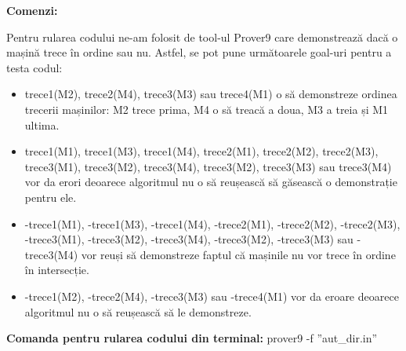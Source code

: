     \inputminted[linenos]{C}{cod/aut_dir.in}



    
\textbf{Comenzi:}

Pentru rularea codului ne-am folosit de tool-ul Prover9 care demonstrează dacă o mașină trece în ordine sau nu. Astfel, se pot pune următoarele goal-uri pentru a testa codul:


 \begin{itemize}
    \setlength\itemsep{0em}
    \item trece1(M2), trece2(M4), trece3(M3) sau trece4(M1) o să demonstreze ordinea trecerii mașinilor: M2 trece prima, M4 o să treacă a doua, M3 a treia și M1 ultima.
    \item trece1(M1), trece1(M3), trece1(M4), trece2(M1), trece2(M2), trece2(M3), trece3(M1), trece3(M2), trece3(M4), trece3(M2), trece3(M3) sau trece3(M4)  vor da erori deoarece algoritmul nu o să reușească să găsească o demonstrație pentru ele.
    \item -trece1(M1), -trece1(M3), -trece1(M4), -trece2(M1), -trece2(M2), -trece2(M3), -trece3(M1), -trece3(M2), -trece3(M4), -trece3(M2), -trece3(M3) sau -trece3(M4) vor reuși să demonstreze faptul că mașinile nu vor trece în ordine în intersecție.
    \item -trece1(M2), -trece2(M4), -trece3(M3) sau -trece4(M1) vor da eroare deoarece algoritmul nu o să reușească să le demonstreze.  

\end{itemize}


\textbf{Comanda pentru rularea codului din terminal:}
prover9 -f ”aut\_dir.in”
